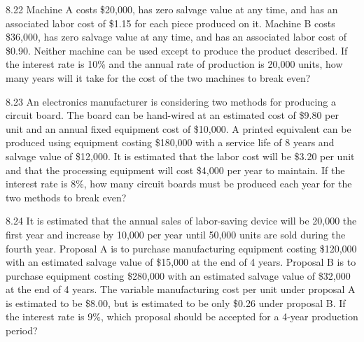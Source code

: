 \begin{exsol@solution}{}
\end{exsol@solution}
\begin{exsol@exercise}{8.22}
    \label{sea-8-22}
        Machine A costs \$20,000, has zero salvage value at any time, and has an associated labor cost of \$1.15 for each piece produced on it. Machine B costs \$36,000, has zero salvage value at any time, and has an associated labor cost of \$0.90. Neither machine can be used except to produce the product described. If the interest rate is 10\% and the annual rate of production is 20,000 units, how many years will it take for the cost of the two machines to break even?
\end{exsol@exercise}
\begin{exsol@solution}{}
\end{exsol@solution}
\begin{exsol@exercise}{8.23}
    \label{sea-8-23}
        An electronics manufacturer is considering two methods for producing a circuit board. The board can be hand-wired at an estimated cost of \$9.80 per unit and an annual fixed equipment cost of \$10,000. A printed equivalent can be produced using equipment costing \$180,000 with a service life of 8 years and salvage value of \$12,000. It is estimated that the labor cost will be \$3.20 per unit and that the processing equipment will cost \$4,000 per year to maintain. If the interest rate is 8\%, how many circuit boards must be produced each year for the two methods to break even?
\end{exsol@exercise}
\begin{exsol@solution}{}
\end{exsol@solution}
\begin{exsol@exercise}{8.24}
    \label{sea-8-24}
        It is estimated that the annual sales of labor-saving device will be 20,000 the first year and increase by 10,000 per year until 50,000 units are sold during the fourth year. Proposal A is to purchase manufacturing equipment costing \$120,000 with an estimated salvage value of \$15,000 at the end of 4 years. Proposal B is to purchase equipment costing \$280,000 with an estimated salvage value of \$32,000 at the end of 4 years. The variable manufacturing cost per unit under proposal A is estimated to be \$8.00, but is estimated to be only \$0.26 under proposal B. If the interest rate is 9\%, which proposal should be accepted for a 4-year production period?
\end{exsol@exercise}
\begin{exsol@solution}{}
\end{exsol@solution}
